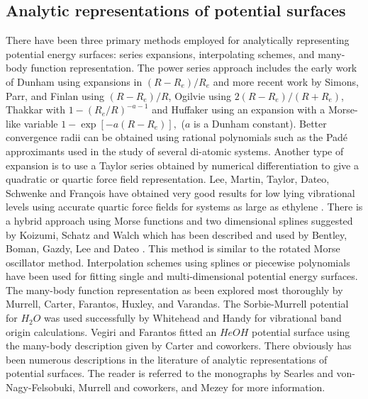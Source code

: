 \documentclass[12pt,thmsa]{article}
\begin{document}
\subsection{Analytic representations of potential surfaces}

There have been three primary methods employed for analytically representing
potential energy surfaces: series expansions, interpolating schemes, and
many-body function representation. The power series approach includes the
early work of Dunham\cite{Dunham32a,Dunham32b} using expansions in $%
(R-R_e)/R_e$ and more recent work by Simons, Parr, and Finlan\cite{Simons73}
using $(R-R_e)/R$, Ogilvie\cite{Ogilvie81} using $2\left( R-R_e\right)
/\left( R+R_e\right) $, Thakkar\cite{Thakkar75} with $1-(R_e/R)^{-a-1}$ and
Huffaker\cite{Huffaker76} using an expansion with a Morse\cite{Morse29}-like
variable $1-\exp \left[ -a\left( R-R_e\right) \right] ,$ ($a$ is a Dunham
constant). Better convergence radii can be obtained using rational
polynomials such as the Pad\'{e} approximants used in the study of several
di-atomic systems\cite{Jordan74,Jorish79,Sonnleitner81,Pardo86}. Another
type of expansion is to use a Taylor series obtained by numerical
differentiation to give a quadratic or quartic force field representation.
Lee, Martin, Taylor, Dateo, Schwenke and Fran\c{c}ois have obtained very
good results for low lying vibrational levels using accurate quartic force
fields\cite{Lee95a,Dateo94,Martin93,Lee95b} for systems as large as ethylene%
\cite{Martin95}. There is a hybrid approach using Morse functions and two
dimensional splines suggested by Koizumi, Schatz and Walch\cite{Koizumi91}
which has been described and used by Bentley, Boman, Gazdy, Lee and Dateo%
\cite{Bentley92}. This method is similar to the rotated Morse oscillator
method\cite{Bowman75,Connor75}. Interpolation schemes using splines or
piecewise polynomials have been used for fitting single and
multi-dimensional potential energy surfaces\cite
{Forsythe77,Malik80,Sathyamurthy75,Dunne87,Bruehl88}. The many-body function
representation as been explored most thoroughly by Murrell, Carter,
Farantos, Huxley, and Varandas\cite{Murrell84}. The Sorbie-Murrell\cite
{Sorbie75} potential for $H_2O$ was used successfully by Whitehead and Handy%
\cite{Whitehead76} for vibrational band origin calculations. Vegiri and
Farantos\cite{Vergiri88} fitted an $HeOH$ potential surface using the
many-body description given by Carter and coworkers\cite{Carter82}. There
obviously has been numerous descriptions in the literature of analytic
representations of potential surfaces. The reader is referred to the
monographs by Searles and von-Nagy-Felsobuki\cite{Searles93}, Murrell and
coworkers\cite{Murrell84}, and Mezey\cite{Mezey87} for more information.
\end{document}
